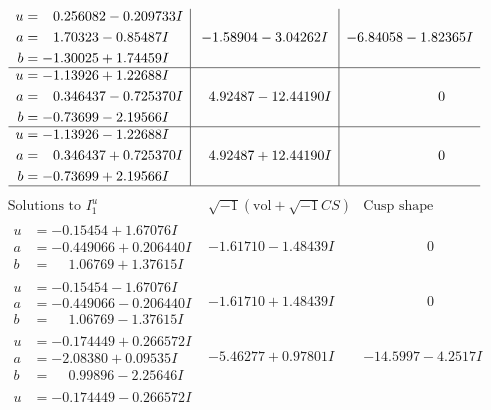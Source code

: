 \documentclass[1p]{elsarticle_modified}
\theoremstyle{definition}
\newcommand{\I}{\sqrt{-1}}
\begin{document}
$$\begin{array}{c|c|c}
\begin{aligned}
u &= \phantom{-}0.256082 - 0.209733 I \\
a &= \phantom{-}1.70323 - 0.85487 I \\
b &= -1.30025 + 1.74459 I\end{aligned}
 & -1.58904 - 3.04262 I & -6.84058 - 1.82365 I \\ \hline\begin{aligned}
u &= -1.13926 + 1.22688 I \\
a &= \phantom{-}0.346437 - 0.725370 I \\
b &= -0.73699 - 2.19566 I\end{aligned}
 & \phantom{-}4.92487 - 12.44190 I & \phantom{-0.000000 } 0 \\ \hline\begin{aligned}
u &= -1.13926 - 1.22688 I \\
a &= \phantom{-}0.346437 + 0.725370 I \\
b &= -0.73699 + 2.19566 I\end{aligned}
 & \phantom{-}4.92487 + 12.44190 I & \phantom{-0.000000 } 0\\
 \hline 
 \end{array}$$\newpage$$\begin{array}{c|c|c}  
\text{Solutions to }I^u_{1}& \I (\text{vol} + \sqrt{-1}CS) & \text{Cusp shape}\\
 \hline 
\begin{aligned}
u &= -0.15454 + 1.67076 I \\
a &= -0.449066 + 0.206440 I \\
b &= \phantom{-}1.06769 + 1.37615 I\end{aligned}
 & -1.61710 - 1.48439 I & \phantom{-0.000000 } 0 \\ \hline\begin{aligned}
u &= -0.15454 - 1.67076 I \\
a &= -0.449066 - 0.206440 I \\
b &= \phantom{-}1.06769 - 1.37615 I\end{aligned}
 & -1.61710 + 1.48439 I & \phantom{-0.000000 } 0 \\ \hline\begin{aligned}
u &= -0.174449 + 0.266572 I \\
a &= -2.08380 + 0.09535 I \\
b &= \phantom{-}0.99896 - 2.25646 I\end{aligned}
 & -5.46277 + 0.97801 I & -14.5997 - 4.2517 I \\ \hline\begin{aligned}
u &= -0.174449 - 0.266572 I \\

\end{aligned}
\end{array}$$
\end{document}
